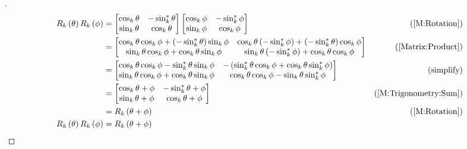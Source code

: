 \documentclass[stu, babel, american, biblatex, a4paper, leqno, draftall]{apa7}
\begin{document}
\begin{proof}[]
    \begin{align*}
        R_k\left(\theta\right)R_k\left(\phi\right)
        &=\begin{bmatrix}
            \cos_k{\theta}  & -\sin_k^\ast{\theta} \\
            \sin_k{\theta} & \cos_k{\theta} \\
        \end{bmatrix}\begin{bmatrix}
            \cos_k{\phi}  & -\sin_k^\ast{\phi} \\
            \sin_k{\phi} & \cos_k{\phi} \\
        \end{bmatrix} & \text{(\cref{M:Rotation})}\\
        &=\begin{bmatrix}
            \cos_k{\theta}\cos_k{\phi}+\left(-\sin_k^\ast{\theta}\right)\sin_k{\phi} &
            \cos_k{\theta}\left(-\sin_k^\ast{\phi}\right)+\left(-\sin_k^\ast{\theta}\right)\cos_k{\phi} \\
            \sin_k{\theta}\cos_k{\phi}+\cos_k{\theta}\sin_k{\phi} &
            \sin_k{\theta}\left(-\sin_k^\ast{\phi}\right)+\cos_k{\theta}\cos_k{\phi} \\
        \end{bmatrix} & \text{(\cref{Matrix:Product})}\\
        &=\begin{bmatrix}
            \cos_k{\theta}\cos_k{\phi}-\sin_k^\ast{\theta}\sin_k{\phi} &
            -\left(\sin_k^\ast{\theta}\cos_k{\phi}+\cos_k{\theta}\sin_k^\ast{\phi}\right) \\
            \sin_k{\theta}\cos_k{\phi}+\cos_k{\theta}\sin_k{\phi} &
            \cos_k{\theta}\cos_k{\phi}-\sin_k{\theta}\sin_k^\ast{\phi} \\
        \end{bmatrix} & \text{(simplify)}\\
        &=\begin{bmatrix}
            \cos_k{\theta+\phi}  & -\sin_k^\ast{\theta+\phi} \\
            \sin_k{\theta+\phi} & \cos_k{\theta+\phi} \\
        \end{bmatrix} & \text{(\cref{M:Trigonometry:Sum})} \\
        &= R_k\left(\theta+\phi\right) & \text{(\cref{M:Rotation})} \\
        R_k\left(\theta\right)R_k\left(\phi\right)
        &= R_k\left(\theta+\phi\right) & \qedhere
    \end{align*}
\end{proof}
\end{document}
